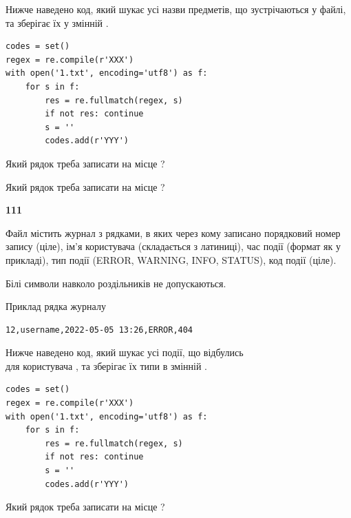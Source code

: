 Нижче наведено код, який шукає усі назви предметів, що зустрічаються у файлі, та зберігає їх у змінній .



\begin{verbatim}
codes = set()
regex = re.compile(r'XXX')
with open('1.txt', encoding='utf8') as f:
    for s in f:
        res = re.fullmatch(regex, s)
        if not res: continue
        s = ''
        codes.add(r'YYY')
\end{verbatim}





Який рядок треба записати на місце  ?\par
\vspace{5mm}


Який рядок треба записати на місце  ?\par


\newpage

{\begin {center}\textbf{ 111}\end {center}}\par
Файл  містить журнал з рядками, в яких через кому записано поряд\-ко\-вий номер запису (ціле), ім'я користувача (складається з латиниці), час події (фор\-мат як у прикладі), тип події (ERROR, WARNING, INFO, STATUS), код події (ціле).

Білі символи навколо роздільників не допускаються.

Приклад рядка журналу



\begin{verbatim}
12,username,2022-05-05 13:26,ERROR,404
\end{verbatim}


Нижче наведено код, який шукає усі події, що відбулись\\ для користувача , та зберігає їх типи в змінній .



\begin{verbatim}
codes = set()
regex = re.compile(r'XXX')
with open('1.txt', encoding='utf8') as f:
    for s in f:
        res = re.fullmatch(regex, s)
        if not res: continue
        s = ''
        codes.add(r'YYY')
\end{verbatim}





Який рядок треба записати на місце  ?\par
\vspace{5mm}


